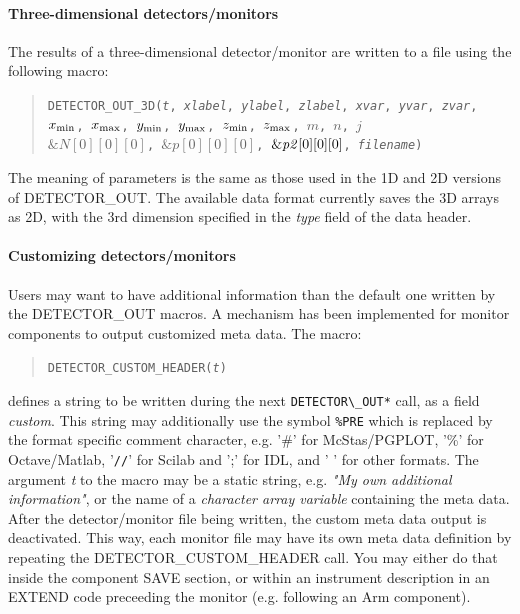 \paragraph{Three-dimensional detectors/monitors}

The results of a three-dimensional detector/\discretionary{}{}{}mon\-i\-tor are written to a file using the
following macro:

\begin{quote}
  \texttt{DETECTOR\_OUT\_3D({\it t},
        {\it xlabel}, {\it ylabel}, {\it zlabel},
        {\it xvar}, {\it yvar}, {\it zvar},
        $x_{\rm min}$, $x_{\rm max}$, $y_{\rm min}$, $y_{\rm max}$,
        $z_{\rm min}$, $z_{\rm max}$, $m$, $n$, $j$\\
          $\&N[0][0][0]$, $\&p[0][0][0]$, $\&{\it p2}[0][0][0]$,
        {\it filename})}
\end{quote}
The meaning of parameters is the same as those used in the 1D and 2D
versions of DETECTOR\_OUT. The available data format currently saves
the 3D arrays as 2D, with the 3rd dimension specified in the {\it
  type} field of the data header.

\paragraph{Customizing detectors/monitors}

Users may want to have additional information than the default one written by
the DETECTOR\_OUT macros. A mechanism has been implemented for monitor
components to output customized meta data. The macro:

\begin{quote}
  \texttt{DETECTOR\_CUSTOM\_HEADER({\it t})}
\end{quote}

defines a string to be written during the next \verb+DETECTOR\_OUT*+ call, as a field {\it custom}. This string may additionally use the symbol \verb+%PRE+ which is replaced by the format specific comment character, e.g. '\#' for McStas/PGPLOT, '\%' for Octave/Matlab, '\verb+//+' for Scilab and ';' for IDL, and ' ' for other formats. The argument {\it t} to the macro may be a static string, e.g. {\it "My own additional information"}, or the name of a {\it character array variable} containing the meta data. After the detector/monitor file being written, the custom meta data output is deactivated. This way, each monitor file may have its own meta data definition by repeating the DETECTOR\_CUSTOM\_HEADER call. You may either do that inside the component SAVE section, or within an instrument description in an EXTEND code preceeding the monitor (e.g. following an Arm component).


